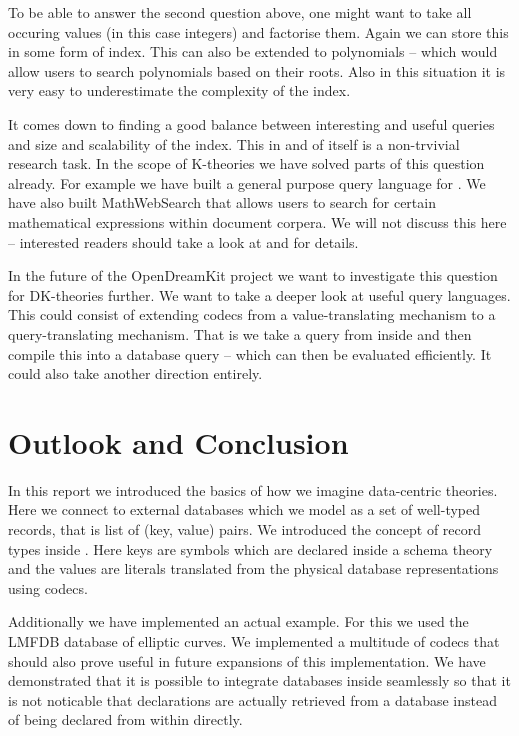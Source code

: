 \documentclass{deliverablereport}
\begin{document}
To be able to answer the second question above, one might want to take all occuring values (in this case integers) and factorise them. Again we can store this in some form of index. This can also be extended to polynomials -- which would allow users to search polynomials based on their roots. Also in this situation it is very easy to underestimate the complexity of the index.

It comes down to finding a good balance between interesting and useful queries and size and scalability of the index. This in and of itself is a non-trvivial research task. In the scope of K-theories we have solved parts of this question already. For example we have built a general purpose query language for \MMT. We have also built MathWebSearch that allows users to search for certain mathematical expressions within document corpera. We will not discuss this here -- interested readers should take a look at \cite{Rabe:qlfml12} and \cite{ODK-D6.1} for details.

In the future of the OpenDreamKit project we want to investigate this question for DK-theories further. We want to take a deeper look at useful query languages. This could consist of extending codecs from a value-translating mechanism to a query-translating mechanism. That is we take a query from inside \MMT and then compile this into a database query -- which can then be evaluated efficiently. It could also take another direction entirely.

\section{Outlook and Conclusion}\label{sec:conclusion}

In this report we introduced the basics of how we imagine \MMT data-centric theories. Here we connect to external databases which we model as a set of well-typed records, that is list of (key, value) pairs. We introduced the concept of record types inside \MMT. Here keys are symbols which are declared inside a schema theory and the values are \MMT literals translated from the physical database representations using codecs.

Additionally we have implemented an actual example. For this we used the LMFDB database of elliptic curves. We implemented a multitude of codecs that should also prove useful in future expansions of this implementation. We have demonstrated that it is possible to integrate databases inside \MMT seamlessly so that it is not noticable that declarations are actually retrieved from a database instead of being declared from within \MMT directly.
\end{document}
